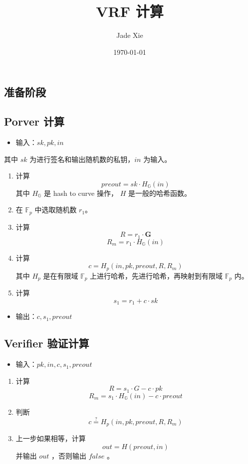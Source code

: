 \documentclass[10pt]{ctexart}
\title{VRF 计算}
\author{Jade Xie}
\date{\today}
\begin{document}
\maketitle

\subsection{准备阶段}



\subsection{Porver 计算}

\begin{itemize}
    \item 输入：$sk, pk, in$
\end{itemize}
其中 $sk$ 为进行签名和输出随机数的私钥，$in$ 为输入。

\begin{enumerate}
    \item 计算 \[preout = sk \cdot H_{\mathbb{G}}(in)\] 其中 $H_{\mathbb{G}}$ 是 hash to curve 操作， $H$ 是一般的哈希函数。
    \item 在 $\mathbb{F}_p$ 中选取随机数 $r_1$。
    \item 计算 \[ R = r_1 \cdot \mathbf{G} \] \[R_m = r_1 \cdot H_{\mathbb{G}}(in)\]
    \item 计算 \[c = H_p(in, pk, preout, R, R_m)\] 其中 $H_p$ 是在有限域 $\mathbb{F}_p$ 上进行哈希，先进行哈希，再映射到有限域 $\mathbb{F}_p$ 内。
    \item 计算 \[s_1 = r_1 + c \cdot sk\]
\end{enumerate}

\begin{itemize}
    \item 输出：$c, s_1, preout$
\end{itemize}

\subsection{Verifier 验证计算}

\begin{itemize}
    \item 输入：$pk, in, c, s_1, preout$
\end{itemize}

\begin{enumerate}
    \item 计算 \[R = s_1 \cdot G - c \cdot pk\] \[R_m = s_1 \cdot  H_{\mathbb{G}}(in) - c \cdot preout\]
    \item 判断 \[c \overset{?}{=} H_p(in, pk, preout, R, R_m)\]
    \item 上一步如果相等，计算 \[out = H(preout, in)\]并输出 $out$ ，否则输出 $false$ 。
\end{enumerate}
\end{document}
